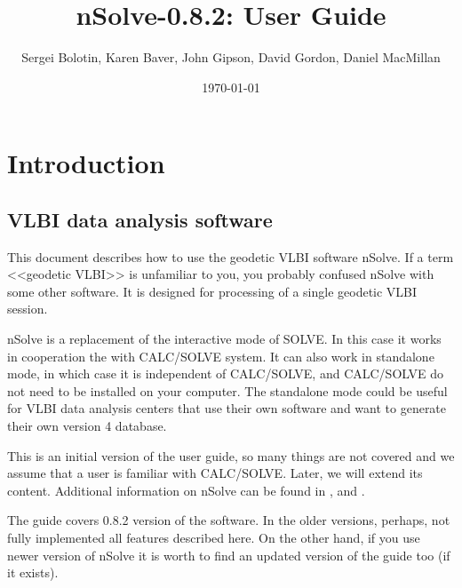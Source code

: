 \documentclass [10pt,letterpaper]{report}
\newcommand{\nuSolve}{\greektext n\latintext Solve}
\newcommand{\thisVersion}{0.8.2}
\begin{document}
\title{\nuSolve{}-\thisVersion{}: User Guide}

\author{
Sergei Bolotin,
Karen Baver,
John Gipson,
David Gordon,
Daniel MacMillan
}

\date{\today}


\maketitle

\tableofcontents


\def\leftSp      {48mm}
\def\riteSp     {113mm}


\chapter{Introduction}
\label{intro}




\section{VLBI data analysis software}

This document describes how to use the geodetic VLBI software \nuSolve{}.
If a term <<geodetic VLBI>> is unfamiliar to you, you probably confused
\nuSolve{} with some other software. It is designed for processing of a
single geodetic VLBI session.

\nuSolve{} is a replacement of the interactive mode of SOLVE. In this
case it works in cooperation the with CALC/SOLVE system. It can also
work in standalone mode, in which case it is independent of CALC/SOLVE,
and CALC/SOLVE do not need to be installed on your computer. The
standalone mode could be useful for VLBI data analysis centers that use
their own software and want to generate their own version 4 database.

This is an initial version of the user guide, so many things are not
covered and we assume that a user is familiar with CALC/SOLVE. Later,
we will extend its content. Additional information on \nuSolve{} can be
found in \cite{Bolotin2010}, \cite{Bolotin2011} and \cite{Bolotin2012}.

The guide covers {\thisVersion{}} version of the software. In the older
versions, perhaps, not fully implemented all features described here.
On the other hand, if you use newer version of \nuSolve{} it is worth
to find an updated version of the guide too (if it exists).
\end{document}
